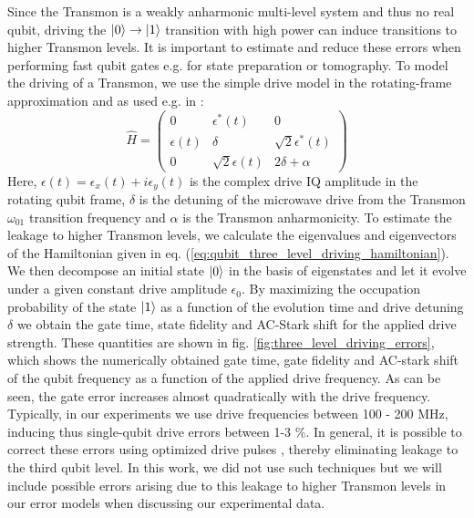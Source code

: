 Since the Transmon is a weakly anharmonic multi-level system and thus no real qubit, driving the $\left| 0 \right>\to\left| 1 \right>$ transition with high power can induce transitions to higher Transmon levels. It is important to estimate and reduce these errors when performing fast qubit gates e.g. for state preparation or tomography. To model the driving of a Transmon, we use the simple drive model in the rotating-frame approximation and as used e.g. in \cite{motzoi_simple_2009}:
%
\begin{equation}
\hat{H} = \left(
						 \begin{array}{ccc}
						0 & \epsilon^*(t) & 0 \\
						\epsilon(t) & \delta & \sqrt{2}\epsilon^*(t) \\
						0 & \sqrt{2}\epsilon(t) & 2\delta + \alpha
						\end{array}
					\right) \label{eq:qubit_three_level_driving_hamiltonian}
\end{equation}
%
Here, $\epsilon(t) = \epsilon_x(t)+i\epsilon_y(t)$ is the complex drive IQ amplitude in the rotating qubit frame, $\delta$ is the detuning of the microwave drive from the Transmon $\omega_{01}$ transition frequency and $\alpha$ is the Transmon anharmonicity. To estimate the leakage to higher Transmon levels, we calculate the eigenvalues and eigenvectors of the Hamiltonian given in eq. (\ref{eq:qubit_three_level_driving_hamiltonian}). We then decompose an initial state $\left| 0 \right>$ in the basis of eigenstates and let it evolve under a given constant drive amplitude $\epsilon_0$. By maximizing the occupation probability of the state $\left| 1 \right>$ as a function of the evolution time and drive detuning $\delta$ we obtain the gate time, state fidelity and AC-Stark shift for the applied drive strength. These quantities are shown in fig. \ref{fig:three_level_driving_errors}, which shows the numerically obtained gate time, gate fidelity and AC-stark shift of the qubit frequency as a function of the applied drive frequency. As can be seen, the gate error increases almost quadratically with the drive frequency. Typically, in our experiments we use drive frequencies between 100 - 200 MHz, inducing thus single-qubit drive errors between 1-3 \%. In general, it is possible to correct these errors using optimized drive pulses \cite{lucero_reduced_2010,chow_optimized_2010}, thereby eliminating leakage to the third qubit level. In this work, we did not use such techniques but we will  include possible errors arising due to this leakage to higher Transmon levels in our error models when discussing our experimental data.

